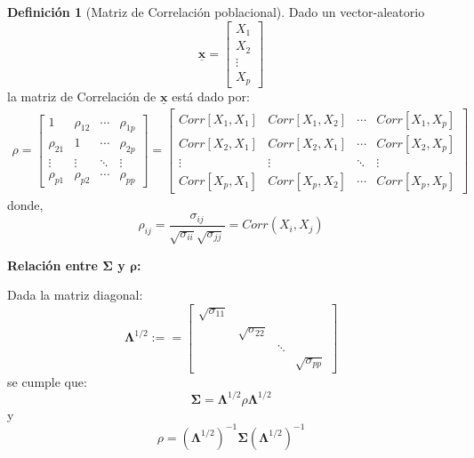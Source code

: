 \documentclass[
]{book}
\theoremstyle{definition}
\newtheorem{definition}{Definición}[chapter]
\theoremstyle{definition}
\theoremstyle{definition}
\theoremstyle{definition}
\theoremstyle{remark}
\begin{document}
\begin{definition}[Matriz de Correlación poblacional]
\protect\hypertarget{def:matriz-cor}{}\label{def:matriz-cor}Dado un vector-aleatorio
\[
\underline{\mathbf{x}}=\begin{bmatrix}
X_1\\X_2\\ \vdots \\ X_p
\end{bmatrix}
\]
la matriz de Correlación de \(\underline{\mathbf{x}}\) está dado por:
\begin{align*}
\rho
= \begin{bmatrix}
1 & \rho_{12}& \cdots &  \rho_{1p}\\
\rho_{21} & 1 & \cdots &  \rho_{2p}\\
\vdots & \vdots & \ddots & \vdots\\
\rho_{p1}& \rho_{p2}& \cdots &  \rho_{pp}
\end{bmatrix}=\begin{bmatrix}
Corr[X_1,X_1]& Corr[X_1,X_2]& \cdots & Corr[X_1,X_p]\\
Corr[X_2,X_1]& Corr[X_2,X_1]& \cdots & Corr[X_2,X_p]\\
\vdots & \vdots & \ddots & \vdots\\
Corr[X_p,X_1]& Corr[X_p,X_2]& \cdots & Corr[X_p,X_p]
\end{bmatrix}
\end{align*}
donde,
\[
\rho_{ij}=\frac{\sigma_{ij}}{\sqrt{\sigma_{ii}}\sqrt{\sigma_{jj}}}=Corr(X_i,X_j)
\]
\end{definition}

\textbf{Relación entre \(\mathbf{\Sigma}\) y \(\mathbf{\rho}\):}

Dada la matriz diagonal:
\[
\mathbf{\mathbf{\mathbf{\mathbf{\mathbf{\mathbf{\Lambda}}}}}}^{1/2}:=
= \begin{bmatrix}
\sqrt{\sigma_{11}} & &  &  \\
& \sqrt{\sigma_{22}} &  &  \\
&  & \ddots & \\
& &  &  \sqrt{\sigma_{pp}}
\end{bmatrix}
\]
se cumple que:
\[
\mathbf{\Sigma}=\mathbf{\mathbf{\mathbf{\mathbf{\mathbf{\Lambda}}}}}^{1/2}\rho \mathbf{\mathbf{\mathbf{\mathbf{\mathbf{\Lambda}}}}}^{1/2}
\]
y
\[
\rho=(\mathbf{\mathbf{\mathbf{\mathbf{\mathbf{\Lambda}}}}}^{1/2})^{-1}\mathbf{\Sigma} (\mathbf{\mathbf{\mathbf{\mathbf{\mathbf{\Lambda}}}}}^{1/2})^{-1}
\]
\end{document}
